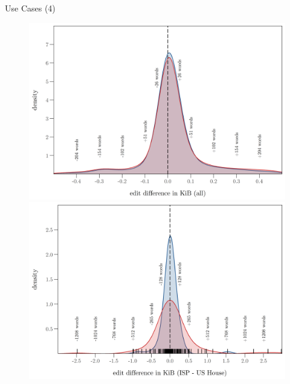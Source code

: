 \begin{frame}{Use Cases (4)}
\begin{figure}[t]
\begin{center}
\vspace{-.1cm}
\hspace*{-0.95cm}
	\includegraphics[scale=.38]{uc_4_usah_cont2.png}
\hspace*{-0.1cm}
	\includegraphics[scale=.38]{uc_4_usah_cont3.png}
	\vspace{-.5cm}
\end{center}
\end{figure}
\end{frame}

